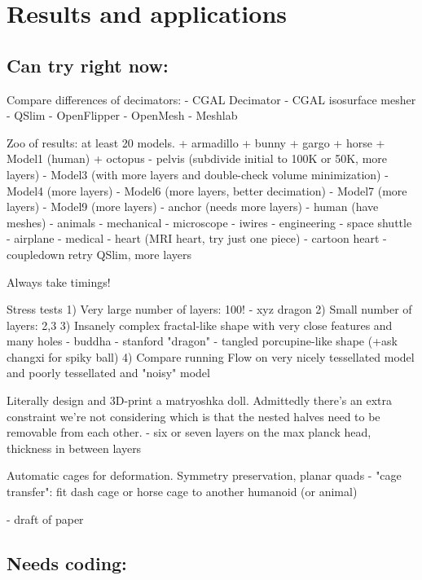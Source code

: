 
\section{Results and applications}
\label{sec:results}

\subsection{Can try right now:}

Compare differences of decimators:
  - CGAL Decimator
  - CGAL isosurface mesher
  - QSlim
  - OpenFlipper
  - OpenMesh
  - Meshlab


Zoo of results: at least 20 models.
  + armadillo
  + bunny
  + gargo
  + horse
  + Model1 (human)
  + octopus
  - pelvis (subdivide initial to 100K or 50K, more layers)
  - Model3 (with more layers and double-check volume minimization)
  - Model4 (more layers)
  - Model6 (more layers, better decimation)
  - Model7 (more layers)
  - Model9 (more layers)
  - anchor (needs more layers)
  - human (have meshes)
  - animals
  - mechanical
    - microscope
    - iwires
  - engineering
    - space shuttle
    - airplane
  - medical
    - heart (MRI heart, try just one piece)
    - cartoon heart
  - coupledown retry QSlim, more layers

Always take timings!

Stress tests
  1) Very large number of layers: 100!
    - xyz dragon
  2) Small number of layers: 2,3
  3) Insanely complex fractal-like shape with very close features and many holes
    - buddha
    - stanford "dragon"
    - tangled porcupine-like shape (+ask changxi for spiky ball)
  4) Compare running Flow on very nicely tessellated model and poorly
  tessellated and "noisy" model

Literally design and 3D-print a matryoshka doll. Admittedly there's an extra
constraint we're not considering which is that the nested halves need to be
removable from each other.
  - six or seven layers on the max planck head, thickness in between layers

Automatic cages for deformation. Symmetry preservation, planar quads
  - "cage transfer": fit dash cage or horse cage to another humanoid (or
    animal)

- draft of paper

\subsection{Needs coding:}

